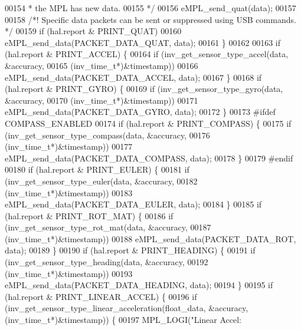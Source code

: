 \begin{DoxyCode}
00154 \textcolor{comment}{        * the MPL has new data.}
00155 \textcolor{comment}{        */}
00156         eMPL\_send\_quat(data);
00157 
00158         \textcolor{comment}{/*! Specific data packets can be sent or suppressed using USB commands. */}
00159         \textcolor{keywordflow}{if} (hal.report & PRINT_QUAT)
00160             eMPL\_send\_data(PACKET\_DATA\_QUAT, data);
00161     \}
00162 
00163     \textcolor{keywordflow}{if} (hal.report & PRINT_ACCEL) \{
00164         \textcolor{keywordflow}{if} (inv\_get\_sensor\_type\_accel(data, &accuracy,
00165             (inv\_time\_t*)&timestamp))
00166             eMPL\_send\_data(PACKET\_DATA\_ACCEL, data);
00167     \}
00168     \textcolor{keywordflow}{if} (hal.report & PRINT_GYRO) \{
00169         \textcolor{keywordflow}{if} (inv\_get\_sensor\_type\_gyro(data, &accuracy,
00170             (inv\_time\_t*)&timestamp))
00171             eMPL\_send\_data(PACKET\_DATA\_GYRO, data);
00172     \}
00173 \textcolor{preprocessor}{#}\textcolor{preprocessor}{ifdef} \textcolor{preprocessor}{COMPASS\_ENABLED}
00174     \textcolor{keywordflow}{if} (hal.report & PRINT\_COMPASS) \{
00175         \textcolor{keywordflow}{if} (inv\_get\_sensor\_type\_compass(data, &accuracy,
00176             (inv\_time\_t*)&timestamp))
00177             eMPL\_send\_data(PACKET\_DATA\_COMPASS, data);
00178     \}
00179 \textcolor{preprocessor}{#}\textcolor{preprocessor}{endif}
00180     \textcolor{keywordflow}{if} (hal.report & PRINT_EULER) \{
00181         \textcolor{keywordflow}{if} (inv\_get\_sensor\_type\_euler(data, &accuracy,
00182             (inv\_time\_t*)&timestamp))
00183             eMPL\_send\_data(PACKET\_DATA\_EULER, data);
00184     \}
00185     \textcolor{keywordflow}{if} (hal.report & PRINT_ROT_MAT) \{
00186         \textcolor{keywordflow}{if} (inv\_get\_sensor\_type\_rot\_mat(data, &accuracy,
00187             (inv\_time\_t*)&timestamp))
00188             eMPL\_send\_data(PACKET\_DATA\_ROT, data);
00189     \}
00190     \textcolor{keywordflow}{if} (hal.report & PRINT_HEADING) \{
00191         \textcolor{keywordflow}{if} (inv\_get\_sensor\_type\_heading(data, &accuracy,
00192             (inv\_time\_t*)&timestamp))
00193             eMPL\_send\_data(PACKET\_DATA\_HEADING, data);
00194     \}
00195     \textcolor{keywordflow}{if} (hal.report & PRINT_LINEAR_ACCEL) \{
00196         \textcolor{keywordflow}{if} (inv\_get\_sensor\_type\_linear\_acceleration(float\_data, &accuracy, (inv\_time\_t*)&timestamp)) \{
00197             MPL\_LOGI(\textcolor{stringliteral}{"Linear Accel: %
}
\end{DoxyCode}
